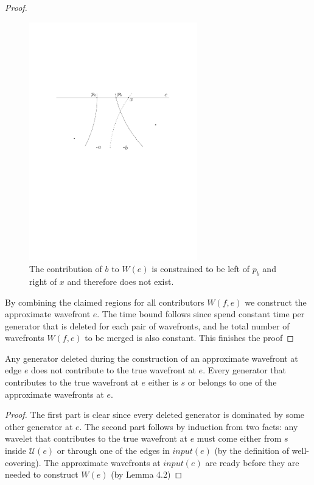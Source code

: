\begin{proof}
    \begin{figure}[H]
	\centering
	\includegraphics[width=0.65\textwidth]{figures/contribution.pdf}
	\caption{The contribution of $b$ to $W(e)$ is constrained to be left of $p_b$ 
    		 and right of $x$ and therefore does not exist\cite{HershbergerS99}.}
	\label{fig:artificialwavefront2}
	\end{figure}

	By combining the claimed regions for all contributors $W(f,e)$ we construct
	the approximate wavefront $e$. The time bound follows since spend constant
	time per generator that is deleted for each pair of wavefronts, and he total
	number of wavefronts $W(f,e)$ to be merged is also constant. This finishes
	the proof
\end{proof}
\begin{Lemma}
	Any generator deleted during the construction of an approximate wavefront at
	edge $e$ does not contribute to the true wavefront at $e$. Every generator
	that contributes to the true wavefront at $e$ either is $s$ or belongs to
	one of the approximate wavefronts at $e$.
\end{Lemma}
\begin{proof}
	The first part is clear since every deleted generator is dominated by some other
	generator at $e$. The second part follows by induction from two facts: any
	wavelet that contributes to the true wavefront at $e$ must come either from
	$s$ inside $\mathcal{U}(e)$ or through one of the edges in $input(e)$ (by
	the definition of well-covering). The approximate wavefronts at $input(e)$
	are ready before they are needed to construct $W(e)$ (by Lemma 4.2)
\end{proof}

